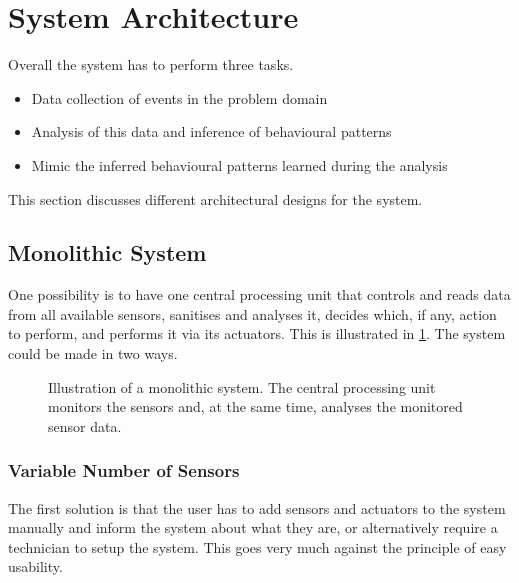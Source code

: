 \section{System Architecture}\label{sec:architecture}

Overall the system has to perform three tasks.

\begin{itemize}
\item Data collection of events in the problem domain
\item Analysis of this data and inference of behavioural patterns
\item Mimic the inferred behavioural patterns learned during the analysis
\end{itemize}
This section discusses different architectural designs for the system.

\subsection{Monolithic System}
One possibility is to have one central processing unit that controls and reads data  from all available sensors, sanitises and analyses it, decides which, if any, action to perform, and performs it via its actuators. This is illustrated in \cref{fig:monolithic_system}. The system could be made in two ways.

\begin{figure}[htbp]
\centering
{}
\caption[Monolithic system]{Illustration of a monolithic system. The central processing unit monitors the sensors and, at the same time, analyses the monitored sensor data.}\label{fig:monolithic_system}
\end{figure}

\subsubsection{Variable Number of Sensors}
The first solution is that the user has to add sensors and actuators to the system manually and inform the system about what they are, or alternatively require a technician to setup the system. This goes very much against the principle of easy usability.

